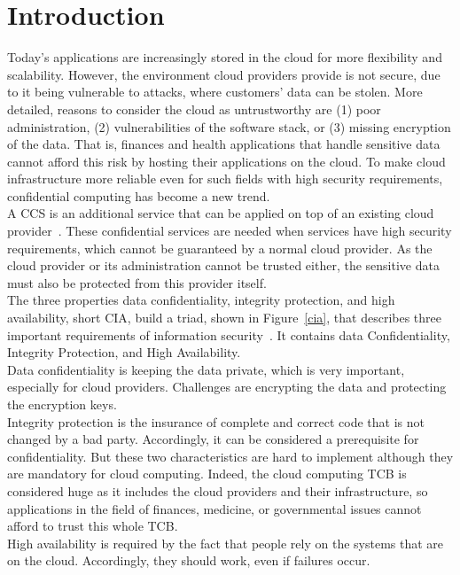 


\section{Introduction}
Today's applications are increasingly stored in the cloud for more flexibility and scalability. However, the environment cloud providers provide is not secure, due to it being vulnerable to attacks, where customers' data can be stolen. More detailed, reasons to consider the cloud as untrustworthy are (1) poor administration, (2) vulnerabilities of the software stack, or (3) missing encryption of the data.
  That is, finances and health applications that handle sensitive data cannot afford this risk by hosting their applications on the cloud. To make cloud infrastructure more reliable even for such fields with high security requirements, confidential computing has become a new trend.\\
 A CCS is an additional service that can be applied on top of an existing cloud provider~\cite{confidentiality}. These confidential services are needed when services have high security requirements, which cannot be guaranteed by a normal cloud provider. As the cloud provider or its administration cannot be trusted either, the sensitive data must also be protected from this provider itself. \\
 The three properties data confidentiality, integrity protection, and high availability, short CIA, build a triad,  shown in Figure~\ref{cia},  that describes three important requirements of information security~\cite{ciaBook, cia}. It contains data Confidentiality, Integrity Protection, and High Availability.\\
 Data confidentiality is keeping the data private, which is very important, especially for cloud providers. Challenges are encrypting the data and protecting the encryption keys.\\
 Integrity protection is the insurance of complete and correct code that is not changed by a bad party. Accordingly, it can be considered a prerequisite for confidentiality. But these two characteristics are hard to implement although they are mandatory for cloud computing. Indeed, the cloud computing TCB  is considered huge as it includes the cloud providers and their infrastructure, so applications in the field of finances, medicine, or governmental issues cannot afford to trust this whole TCB.\\
 High availability is required by the fact that people rely on the systems that are on the cloud. Accordingly, they should work, even if failures occur.\\
